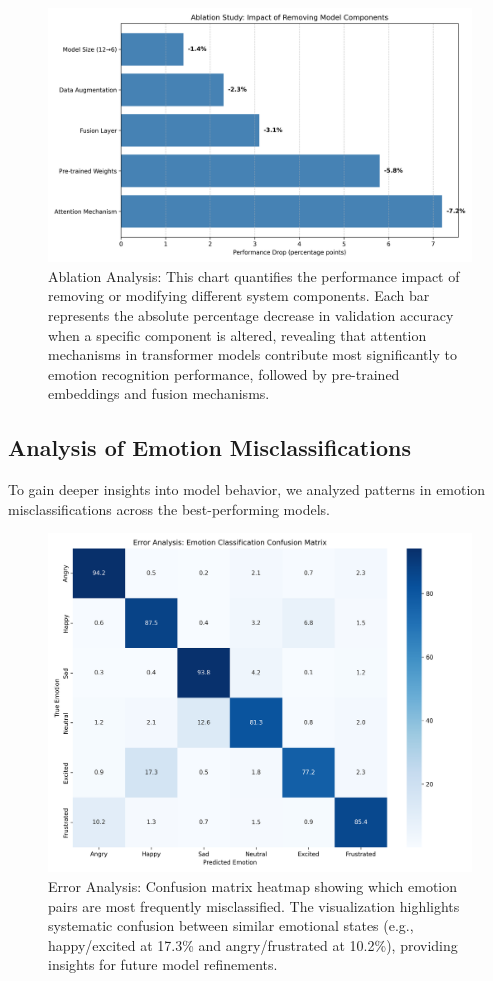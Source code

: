 \documentclass[12pt]{article}
\begin{document}
\begin{figure}[h]
    \centering
    \includegraphics[width=0.9\linewidth]{Figures/ablation_analysis.png}
    \caption{Ablation Analysis: This chart quantifies the performance impact of removing or modifying different system components. Each bar represents the absolute percentage decrease in validation accuracy when a specific component is altered, revealing that attention mechanisms in transformer models contribute most significantly to emotion recognition performance, followed by pre-trained embeddings and fusion mechanisms.}
    \label{fig:ablation_analysis}
\end{figure}

\subsection{Analysis of Emotion Misclassifications}
To gain deeper insights into model behavior, we analyzed patterns in emotion misclassifications across the best-performing models.

\begin{figure}[h]
    \centering
    \includegraphics[width=0.9\linewidth]{Figures/error_analysis.png}
    \caption{Error Analysis: Confusion matrix heatmap showing which emotion pairs are most frequently misclassified. The visualization highlights systematic confusion between similar emotional states (e.g., happy/excited at 17.3\% and angry/frustrated at 10.2\%), providing insights for future model refinements.}
    \label{fig:error_analysis}
\end{figure}

\newpage



\end{document}
